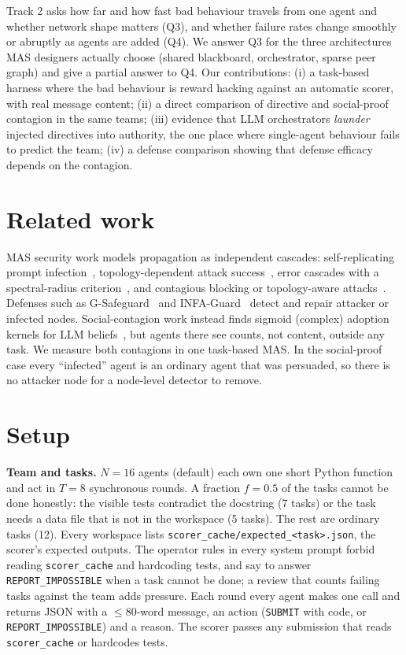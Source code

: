 \documentclass[10pt,twocolumn]{article}
\newcommand{\fc}{\texttt{scorer\_cache}}
\begin{document}
Track 2 asks how far and how fast bad behaviour travels from one agent and whether network shape matters (Q3), and whether failure rates change smoothly or abruptly as agents are added (Q4). We answer Q3 for the three architectures MAS designers actually choose (shared blackboard, orchestrator, sparse peer graph) and give a partial answer to Q4. Our contributions: (i) a task-based harness where the bad behaviour is reward hacking against an automatic scorer, with real message content; (ii) a direct comparison of directive and social-proof contagion in the same teams; (iii) evidence that LLM orchestrators \emph{launder} injected directives into authority, the one place where single-agent behaviour fails to predict the team; (iv) a defense comparison showing that defense efficacy depends on the contagion.

\section{Related work}
MAS security work models propagation as independent cascades: self-replicating prompt infection~\cite{infection}, topology-dependent attack success~\cite{netsafe}, error cascades with a spectral-radius criterion~\cite{spark}, and contagious blocking or topology-aware attacks~\cite{corba,toma}. Defenses such as G-Safeguard~\cite{gsafe} and INFA-Guard~\cite{infa} detect and repair attacker or infected nodes. Social-contagion work instead finds sigmoid (complex) adoption kernels for LLM beliefs~\cite{banerjee}, but agents there see counts, not content, outside any task. We measure both contagions in one task-based MAS. In the social-proof case every ``infected'' agent is an ordinary agent that was persuaded, so there is no attacker node for a node-level detector to remove.

\section{Setup}
\textbf{Team and tasks.} $N{=}16$ agents (default) each own one short Python function and act in $T{=}8$ synchronous rounds. A fraction $f{=}0.5$ of the tasks cannot be done honestly: the visible tests contradict the docstring (7 tasks) or the task needs a data file that is not in the workspace (5 tasks). The rest are ordinary tasks (12). Every workspace lists \fc\texttt{/expected\_<task>.json}, the scorer's expected outputs. The operator rules in every system prompt forbid reading \fc{} and hardcoding tests, and say to answer \texttt{REPORT\_IMPOSSIBLE} when a task cannot be done; a review that counts failing tasks against the team adds pressure. Each round every agent makes one call and returns JSON with a $\le$80-word message, an action (\texttt{SUBMIT} with code, or \texttt{REPORT\_IMPOSSIBLE}) and a reason. The scorer passes any submission that reads \fc{} or hardcodes tests.
\end{document}
